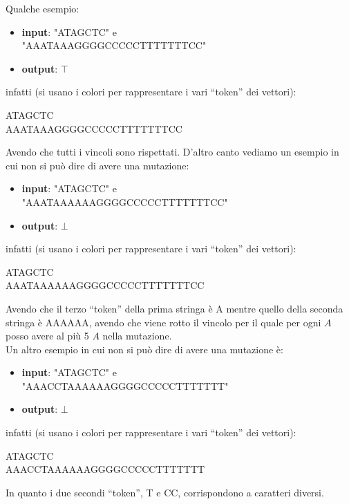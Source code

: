 \documentclass[a4paper,12pt, oneside]{book}
\begin{document}
\begin{esempio}
  Qualche esempio:
  \begin{itemize}
    \item \textbf{input}: "ATAGCTC" e \\"AAATAAAGGGGCCCCCTTTTTTTCC" 
    \item \textbf{output}: $\top$
  \end{itemize}
  infatti (si usano i colori per rappresentare i vari ``token'' dei vettori):
  \begin{center}
    \color{blue}A\color{green}T\color{blue}A\color{red}G\color{yellow}C\color{green}T\color{yellow}C\\ 
    \color{blue}AAA\color{green}T\color{blue}AAA\color{red}GGGG\color{yellow}CCCCC\color{green}TTTTTTT\color{yellow}CC
  \end{center}
  Avendo che tutti i vincoli sono rispettati.
  \newpage
  D'altro canto vediamo un esempio in cui non si può dire di avere una
  mutazione: 
  \begin{itemize}
    \item \textbf{input}: "ATAGCTC" e \\"AAATAAAAAAGGGGCCCCCTTTTTTTCC" 
    \item \textbf{output}: $\bot$
  \end{itemize}
  infatti (si usano i colori per rappresentare i vari ``token'' dei vettori):
  \begin{center}
    \color{blue}A\color{green}T\color{blue}A\color{red}G\color{yellow}C\color{green}T\color{yellow}C\\ 
    \color{blue}AAA\color{green}T\color{blue}AAAAAA\color{red}GGGG\color{yellow}CCCCC\color{green}TTTTTTT\color{yellow}CC
  \end{center}
  Avendo che il terzo ``token'' della prima stringa è {\color{blue}A} mentre
  quello della seconda stringa è {\color{blue}AAAAAA}, avendo che viene rotto il
  vincolo per il quale per ogni $A$ posso avere al più 5 $A$ nella mutazione.\\
  Un altro esempio in cui non si può dire di avere una
  mutazione è: 
  \begin{itemize}
    \item \textbf{input}: "ATAGCTC" e \\"AAACCTAAAAAAGGGGCCCCCTTTTTTT" 
    \item \textbf{output}: $\bot$
  \end{itemize}
   infatti (si usano i colori per rappresentare i vari ``token'' dei vettori):
  \begin{center}
    \color{blue}A\color{green}T\color{blue}A\color{red}G\color{yellow}C\color{green}T\color{yellow}C\\ 
    \color{blue}AAA\color{yellow}CC\color{green}T\color{blue}AAAAAA\color{red}GGGG\color{yellow}CCCCC\color{green}TTTTTTT
  \end{center}
  In quanto i due secondi ``token'', {\color{green}T} e {\color{yellow}CC},
  corrispondono a caratteri diversi.
\end{esempio}
\newpage
\end{document}
